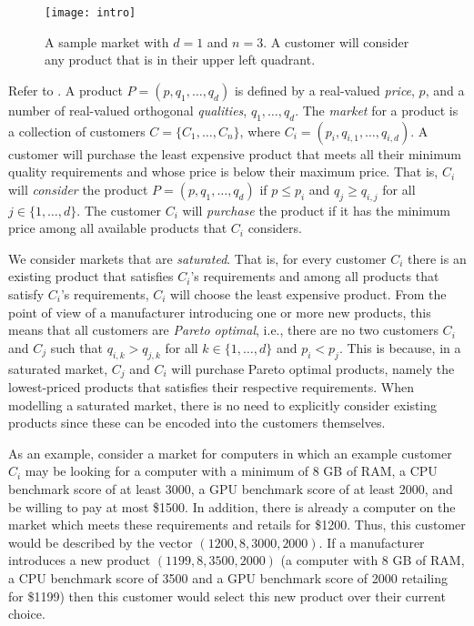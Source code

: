 \documentclass{llncs}
\begin{document}
\begin{figure}
  \begin{center}
    \texttt{[image: intro]}
  \end{center}
  \caption{A sample market with $d=1$ and $n=3$. A customer will consider
           any product that is in their upper left quadrant.}
\end{figure}

Refer to .  A product $P=(p,q_1,\ldots,q_d)$ is defined by a
real-valued \emph{price}, $p$, and a number of real-valued orthogonal
\emph{qualities}, $q_1,\ldots,q_d$.  The \emph{market} for a product is a
collection of customers $C=\{C_1,\ldots,C_n\}$, where
$C_i=(p_i,q_{i,1},\ldots,q_{i,d})$.  A customer will purchase the least
expensive product that meets all their minimum quality requirements and
whose price is below their maximum price.  That is, $C_i$ will
\emph{consider} the product $P=(p,q_1,\ldots,q_d)$ if $p \le p_i$ and $q_j
\ge q_{i,j}$ for all $j\in\{1,\ldots,d\}$.  The customer $C_i$ will
\emph{purchase} the product if it has the minimum price among all available
products that $C_i$ considers.

We consider markets that are \emph{saturated}.  That is, for every
customer $C_i$ there is an existing product that satisfies $C_i$'s
requirements and among all products that satisfy $C_i$'s requirements,
$C_i$ will choose the least expensive product.  From the point of view
of a manufacturer introducing one or more new products, this means that
all customers are \emph{Pareto optimal}, i.e., there are no two customers
$C_i$ and $C_j$ such that $q_{i,k} > q_{j,k}$ for all $k\in\{1,\ldots,d\}$
and $p_i < p_j$.  This is because, in a saturated market, $C_j$ and $C_i$
will purchase Pareto optimal products, namely the lowest-priced products
that satisfies their respective requirements.  When modelling a saturated
market, there is no need to explicitly consider existing products since
these can be encoded into the customers themselves.

As an example, consider a market for computers in which an example customer
$C_i$ may be looking for a computer with a minimum of 8 GB of RAM, a CPU
benchmark score of at least 3000, a GPU benchmark score of at least 2000,
and be willing to pay at most \$1500.  In addition, there is already a
computer on the market which meets these requirements and retails for
\$1200.  Thus, this customer would be described by the vector
$(1200,8,3000,2000)$.  If a manufacturer introduces a new product
$(1199,8,3500,2000)$ (a computer with 8 GB of RAM, a CPU benchmark score of
3500 and a GPU benchmark score of 2000 retailing for \$1199) then this
customer would select this new product over their current choice.
\end{document}
